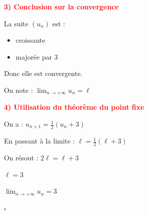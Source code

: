 \documentclass[12pt,a4paper]{article}
\newcounter{exemple}
\newcommand{\exemple}{%
  \refstepcounter{exemple}%
  \textbf{\textcolor{orange}{Exemple \theexemple : }} \ignorespaces
}
\newcounter{solution}
\newcommand{\solution}{%
  \refstepcounter{solution}%
  \textbf{\textcolor{orange}{Solution \thesolution : }} \ignorespaces
}
\begin{document}
\bigskip

\textbf{\textcolor{red}{3) Conclusion sur la convergence}}

La suite $(u_n)$ est :

\begin{itemize}
\item croissante
\item majorée par 3
\end{itemize}

Donc elle est convergente.

On note :
\(
\lim_{n\to+\infty} u_n = \ell
\)

\bigskip

\textbf{\textcolor{red}{4) Utilisation du théorème du point fixe}}

On a :
\(
u_{n+1}=\frac{1}{2}(u_n+3)
\)

En passant à la limite :
\(
\ell=\frac{1}{2}(\ell+3)
\)

On résout :
\(
2\ell=\ell+3
\)

\(
\ell=3
\)


\(
\boxed{\lim_{n\to+\infty} u_n = 3}
\)

\hfill $\square$

\end{document}
